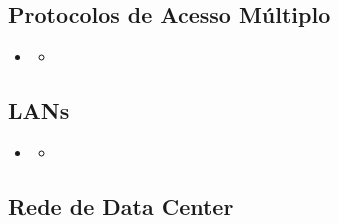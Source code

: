     \subsection{Protocolos de Acesso Múltiplo}
        
        \begin{itemize}[left=0.5cm, align=left, nosep]
            \item 
            \begin{itemize}[left=0.5cm, nosep, label=$\hookrightarrow$]
                \item 
            \end{itemize}
        \end{itemize}
    
        \subsubsection*{}

    
    \subsection{LANs}
        
        \begin{itemize}[left=0.5cm, align=left, nosep]
            \item 
            \begin{itemize}[left=0.5cm, nosep, label=$\hookrightarrow$]
                \item 
            \end{itemize}
        \end{itemize}
    
        \subsubsection*{}


    \subsection{Rede de Data Center}
        
